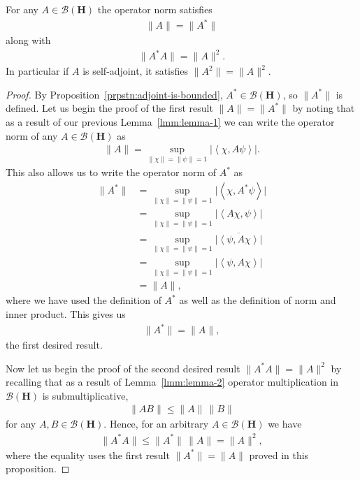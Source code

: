\begin{proposition}
    \label{prpstn:hall-7.2}
    \leanok
    For any $A \in \mathcal{B}(\mathbf{H})$ the operator norm satisfies
    \begin{align}
        \|A\| = \|A^*\|
    \end{align}
    along with
    \begin{align}
        \|A^*A\| = \|A\|^2.
    \end{align}
    In particular if $A$ is self-adjoint, it satisfies $\|A^2\| = \|A\|^2$.
\end{proposition}
\begin{proof}
    \leanok
By Proposition~\ref{prpstn:adjoint-is-bounded}, $A^* \in \mathcal{B}(\mathbf{H})$, so $\|A^*\|$ is defined. Let us begin the proof of the first result $\|A\| = \|A^*\|$ by noting that as a result of our previous Lemma~\ref{lmm:lemma-1} we can write the operator norm of any $A \in \mathcal{B}(\mathbf{H})$ as
\begin{align}
    \|A\| = \sup\limits_{\|\chi\| = \|\psi\| = 1} \lvert \left< \chi, A \psi \right> \rvert.
\end{align}
This also allows us to write the operator norm of $A^*$ as
\begin{align}
    \|A^*\| &= \sup\limits_{\|\chi\| = \|\psi\| = 1} \lvert \left< \chi, A^*\psi \right> \rvert \\
            &= \sup\limits_{\|\chi\| = \|\psi\| = 1} \lvert \left< A\chi, \psi \right> \rvert \\
            &= \sup\limits_{\|\chi\| = \|\psi\| = 1} \lvert \overline{\left< \psi, A\chi \right>} \rvert \\
            &= \sup\limits_{\|\chi\| = \|\psi\| = 1} \lvert \left< \psi, A\chi \right> \rvert \\
            &= \|A\|,
\end{align}
where we have used the definition of $A^*$ as well as the definition of norm and inner product. This gives us
\begin{align}
    \|A^*\| = \|A\|,
\end{align}
the first desired result.

Now let us begin the proof of the second desired result $\|A^*A\| = \|A\|^2$ by recalling that as a result of Lemma~\ref{lmm:lemma-2} operator multiplication in $\mathcal{B}(\mathbf{H})$ is submultiplicative,
\begin{align}
    \|AB\| \le \|A\| \, \|B\|
\end{align}
for any $A,B \in \mathcal{B}(\mathbf{H})$. Hence, for an arbitrary $A \in \mathcal{B}(\mathbf{H})$ we have
\begin{align}
    \|A^*A\| \le \|A^*\| \, \|A\| = \|A\|^2,
\end{align}
where the equality uses the first result $\|A^*\| = \|A\|$ proved in this proposition.


\end{proof}

